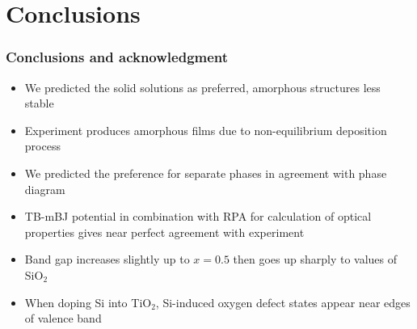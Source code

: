 \documentclass[noamsthm,8pt,t]{beamer}
\begin{document}
\section{Conclusions}
\begin{frame}
   \frametitle{Conclusions and acknowledgment}
   \begin{itemize}
      \item We predicted the solid solutions as preferred, amorphous structures less stable
      \item Experiment produces amorphous films due to non-equilibrium deposition process
      \item We predicted the preference for separate phases in agreement with phase diagram 
      \item<2-> TB-mBJ potential in combination with RPA for calculation of optical properties gives near perfect agreement with experiment
      \item<2-> Band gap increases slightly up to $x = 0.5$ then goes up sharply to values of SiO$_2$
      \item<2-> When doping Si into TiO$_2$, Si-induced oxygen defect states appear near edges of valence band
   \end{itemize}

\end{frame}
\end{document}
